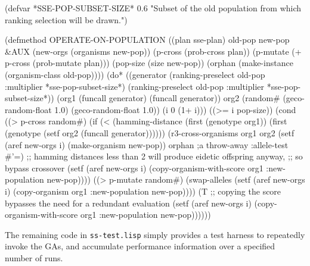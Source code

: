 \filbreak
\begin{clcode}(defvar *SSE-POP-SUBSET-SIZE* 0.6
  {\sf "Subset of the old population from which ranking selection will be drawn."})

(defmethod OPERATE-ON-POPULATION ((plan sse-plan) old-pop new-pop &AUX
                                  (new-orgs (organisms new-pop))
                                  (p-cross (prob-cross plan))
                                  (p-mutate (+ p-cross (prob-mutate plan)))
                                  (pop-size (size new-pop))
                                  (orphan (make-instance
                                           (organism-class old-pop))))
  (do* ((generator (ranking-preselect old-pop
                                      :multiplier *sse-pop-subset-size*)
                   (ranking-preselect old-pop
                                      :multiplier *sse-pop-subset-size*))
        (org1 (funcall generator)
              (funcall generator))
        org2
        (random# (geco-random-float 1.0) (geco-random-float 1.0))
        (i 0 (1+ i)))
       ((>= i pop-size))
    (cond
     ((> p-cross random#)
      (if (< (hamming-distance
              (first (genotype org1))
              (first (genotype (setf org2 (funcall generator))))))
          (r3-cross-organisms
           org1 org2
           (setf (aref new-orgs i) (make-organism new-pop))
           orphan ;a throw-away
           :allele-test #'=)
        ;; {\sf hamming distances less than 2 will produce eidetic offspring anyway,}
        ;; {\sf so bypass crossover}
        (setf (aref new-orgs i)
              (copy-organism-with-score org1 :new-population new-pop))))
     ((> p-mutate random#)
      (swap-alleles (setf (aref new-orgs i)
                          (copy-organism org1 :new-population new-pop))))
     (T ;; {\sf copying the score bypasses the need for a redundant evaluation}
      (setf (aref new-orgs i)
            (copy-organism-with-score org1 :new-population new-pop))))))\end{clcode}
\filbreak

The remaining code in \verb|ss-test.lisp| simply provides a test harness 
to repeatedly invoke the GAs, and accumulate performance information over 
a specified number of runs.


